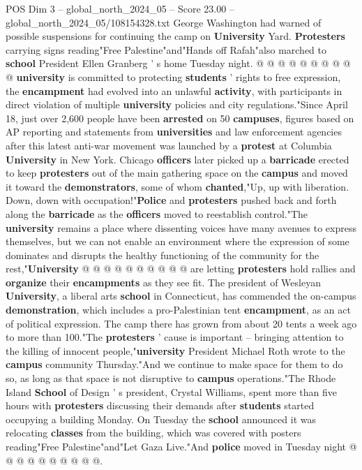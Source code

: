 \begin{textsample}{POS Dim 3 – global\_north\_2024\_05 – Score 23.00 – global\_north\_2024\_05/108154328.txt}
George Washington had warned of possible suspensions for continuing the camp on \textbf{University} Yard. \textbf{Protesters} carrying signs reading"Free Palestine"and"Hands off Rafah"also marched to \textbf{school} President Ellen Granberg ' s home Tuesday night. @ @ @ @ @ @ @ @ @ @ \textbf{university} is committed to protecting \textbf{students} ' rights to free expression, the \textbf{encampment} had evolved into an unlawful \textbf{activity}, with participants in direct violation of multiple \textbf{university} policies and city regulations."Since April 18, just over 2,600 people have been \textbf{arrested} on 50 \textbf{campuses}, figures based on AP reporting and statements from \textbf{universities} and law enforcement agencies after this latest anti-war movement was launched by a \textbf{protest} at Columbia \textbf{University} in New York.
Chicago \textbf{officers} later picked up a \textbf{barricade} erected to keep \textbf{protesters} out of the main gathering space on the \textbf{campus} and moved it toward the \textbf{demonstrators}, some of whom \textbf{chanted},"Up, up with liberation.
Down, down with occupation!"\textbf{Police} and \textbf{protesters} pushed back and forth along the \textbf{barricade} as the \textbf{officers} moved to reestablish control."The \textbf{university} remains a place where dissenting voices have many avenues to express themselves, but we can not enable an environment where the expression of some dominates and disrupts the healthy functioning of the community for the rest,"\textbf{University} @ @ @ @ @ @ @ @ @ @ are letting \textbf{protesters} hold rallies and \textbf{organize} their \textbf{encampments} as they see fit.
The president of Wesleyan \textbf{University}, a liberal arts \textbf{school} in Connecticut, has commended the on-campus \textbf{demonstration}, which includes a pro-Palestinian tent \textbf{encampment}, as an act of political expression.
The camp there has grown from about 20 tents a week ago to more than 100."The \textbf{protesters} ' cause is important -- bringing attention to the killing of innocent people,"\textbf{university} President Michael Roth wrote to the \textbf{campus} community Thursday."And we continue to make space for them to do so, as long as that space is not disruptive to \textbf{campus} operations."The Rhode Island \textbf{School} of Design ' s president, Crystal Williams, spent more than five hours with \textbf{protesters} discussing their demands after \textbf{students} started occupying a building Monday.
On Tuesday the \textbf{school} announced it was relocating \textbf{classes} from the building, which was covered with posters reading"Free Palestine"and"Let Gaza Live."And \textbf{police} moved in Tuesday night @ @ @ @ @ @ @ @ @ @.

\end{textsample}
